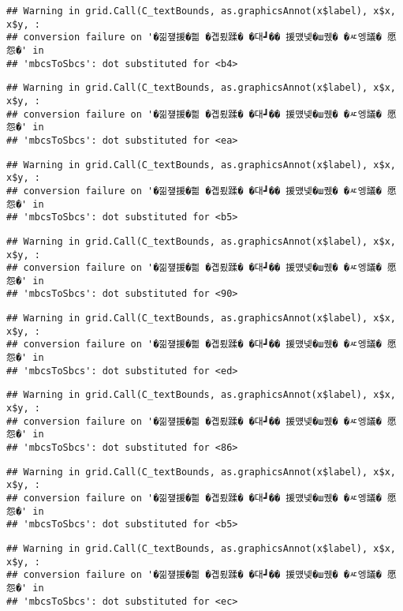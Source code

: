 \documentclass[
]{article}
\begin{document}
\begin{verbatim}
## Warning in grid.Call(C_textBounds, as.graphicsAnnot(x$label), x$x, x$y, :
## conversion failure on '�낆쟾援�쁾 �곕룄蹂� �대┛�� 援먰넻�ш퀬� �ㅼ엥議� 愿怨�' in
## 'mbcsToSbcs': dot substituted for <b4>
\end{verbatim}

\begin{verbatim}
## Warning in grid.Call(C_textBounds, as.graphicsAnnot(x$label), x$x, x$y, :
## conversion failure on '�낆쟾援�쁾 �곕룄蹂� �대┛�� 援먰넻�ш퀬� �ㅼ엥議� 愿怨�' in
## 'mbcsToSbcs': dot substituted for <ea>
\end{verbatim}

\begin{verbatim}
## Warning in grid.Call(C_textBounds, as.graphicsAnnot(x$label), x$x, x$y, :
## conversion failure on '�낆쟾援�쁾 �곕룄蹂� �대┛�� 援먰넻�ш퀬� �ㅼ엥議� 愿怨�' in
## 'mbcsToSbcs': dot substituted for <b5>
\end{verbatim}

\begin{verbatim}
## Warning in grid.Call(C_textBounds, as.graphicsAnnot(x$label), x$x, x$y, :
## conversion failure on '�낆쟾援�쁾 �곕룄蹂� �대┛�� 援먰넻�ш퀬� �ㅼ엥議� 愿怨�' in
## 'mbcsToSbcs': dot substituted for <90>
\end{verbatim}

\begin{verbatim}
## Warning in grid.Call(C_textBounds, as.graphicsAnnot(x$label), x$x, x$y, :
## conversion failure on '�낆쟾援�쁾 �곕룄蹂� �대┛�� 援먰넻�ш퀬� �ㅼ엥議� 愿怨�' in
## 'mbcsToSbcs': dot substituted for <ed>
\end{verbatim}

\begin{verbatim}
## Warning in grid.Call(C_textBounds, as.graphicsAnnot(x$label), x$x, x$y, :
## conversion failure on '�낆쟾援�쁾 �곕룄蹂� �대┛�� 援먰넻�ш퀬� �ㅼ엥議� 愿怨�' in
## 'mbcsToSbcs': dot substituted for <86>
\end{verbatim}

\begin{verbatim}
## Warning in grid.Call(C_textBounds, as.graphicsAnnot(x$label), x$x, x$y, :
## conversion failure on '�낆쟾援�쁾 �곕룄蹂� �대┛�� 援먰넻�ш퀬� �ㅼ엥議� 愿怨�' in
## 'mbcsToSbcs': dot substituted for <b5>
\end{verbatim}

\begin{verbatim}
## Warning in grid.Call(C_textBounds, as.graphicsAnnot(x$label), x$x, x$y, :
## conversion failure on '�낆쟾援�쁾 �곕룄蹂� �대┛�� 援먰넻�ш퀬� �ㅼ엥議� 愿怨�' in
## 'mbcsToSbcs': dot substituted for <ec>
\end{verbatim}
\end{document}
